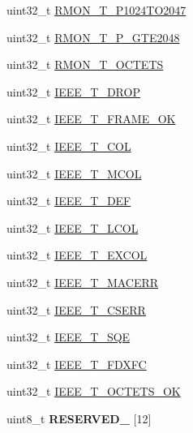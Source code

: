 \begin{DoxyCompactItemize}
\item 
uint32\+\_\+t \hyperlink{struct_e_n_e_t___mem_map_aa4046ccb0e21ae5ab27ece1c01b0f3e1}{R\+M\+O\+N\+\_\+\+T\+\_\+\+P1024\+T\+O2047}
\item 
uint32\+\_\+t \hyperlink{struct_e_n_e_t___mem_map_a58649a32f1b6d79962d779a968712d49}{R\+M\+O\+N\+\_\+\+T\+\_\+\+P\+\_\+\+G\+T\+E2048}
\item 
uint32\+\_\+t \hyperlink{struct_e_n_e_t___mem_map_a23fd2c8d772061dea7e2c5e3a647b2e4}{R\+M\+O\+N\+\_\+\+T\+\_\+\+O\+C\+T\+E\+T\+S}
\item 
uint32\+\_\+t \hyperlink{struct_e_n_e_t___mem_map_abf2a729b70202f56ef30cdfd6488e6c0}{I\+E\+E\+E\+\_\+\+T\+\_\+\+D\+R\+O\+P}
\item 
uint32\+\_\+t \hyperlink{struct_e_n_e_t___mem_map_a85f449e14f1acc146e9a1a50424dce48}{I\+E\+E\+E\+\_\+\+T\+\_\+\+F\+R\+A\+M\+E\+\_\+\+O\+K}
\item 
uint32\+\_\+t \hyperlink{struct_e_n_e_t___mem_map_a03ac6e803f105df7d966e0e147715072}{I\+E\+E\+E\+\_\+\+T\+\_\+C\+O\+L}
\item 
uint32\+\_\+t \hyperlink{struct_e_n_e_t___mem_map_aadeed23e91824e1684a1df65ae3092a0}{I\+E\+E\+E\+\_\+\+T\+\_\+\+M\+C\+O\+L}
\item 
uint32\+\_\+t \hyperlink{struct_e_n_e_t___mem_map_aafb1b9be07fdb0ed86bec13c6d12079d}{I\+E\+E\+E\+\_\+\+T\+\_\+\+D\+E\+F}
\item 
uint32\+\_\+t \hyperlink{struct_e_n_e_t___mem_map_a9a277cea738e72cc0c0295ee68ec1726}{I\+E\+E\+E\+\_\+\+T\+\_\+\+L\+C\+O\+L}
\item 
uint32\+\_\+t \hyperlink{struct_e_n_e_t___mem_map_af146cbbe1695e4bdd737944140402505}{I\+E\+E\+E\+\_\+\+T\+\_\+\+E\+X\+C\+O\+L}
\item 
uint32\+\_\+t \hyperlink{struct_e_n_e_t___mem_map_ad63449bac67967063a21e655cccb1d9e}{I\+E\+E\+E\+\_\+\+T\+\_\+\+M\+A\+C\+E\+R\+R}
\item 
uint32\+\_\+t \hyperlink{struct_e_n_e_t___mem_map_ab48cdc7505cabb90165d8e20ff2643e2}{I\+E\+E\+E\+\_\+\+T\+\_\+\+C\+S\+E\+R\+R}
\item 
uint32\+\_\+t \hyperlink{struct_e_n_e_t___mem_map_a13fe42ca63a29e999abba2172d85f399}{I\+E\+E\+E\+\_\+\+T\+\_\+\+S\+Q\+E}
\item 
uint32\+\_\+t \hyperlink{struct_e_n_e_t___mem_map_adb62449a19466691f4143cb70d0f4ead}{I\+E\+E\+E\+\_\+\+T\+\_\+\+F\+D\+X\+F\+C}
\item 
uint32\+\_\+t \hyperlink{struct_e_n_e_t___mem_map_a0041ed999cf52d11eabf879c2167c353}{I\+E\+E\+E\+\_\+\+T\+\_\+\+O\+C\+T\+E\+T\+S\+\_\+\+O\+K}
\item 
\hypertarget{struct_e_n_e_t___mem_map_a945297f2e7359f23f89956f4aebfa547}{}uint8\+\_\+t {\bfseries R\+E\+S\+E\+R\+V\+E\+D\+\_} \mbox{[}12\mbox{]}\label{struct_e_n_e_t___mem_map_a945297f2e7359f23f89956f4aebfa547}


\end{DoxyCompactItemize}
